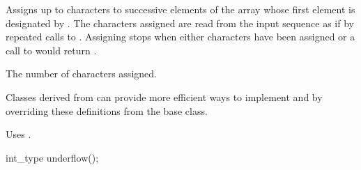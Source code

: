 \begin{itemdescr}
\pnum
\effects
Assigns up to  characters to successive elements of
the array whose first element is designated by .
The characters assigned are read from the input sequence as if
by repeated calls to
.
Assigning stops when either  characters
have been assigned or a call to
would return
.

\pnum
\returns
The number of characters assigned.
\begin{footnote}
Classes derived from
can provide more efficient ways to implement
and
by overriding these definitions from the base class.
\end{footnote}

\pnum
\remarks
Uses
.
\end{itemdescr}

%
\begin{itemdecl}
int_type underflow();
\end{itemdecl}

